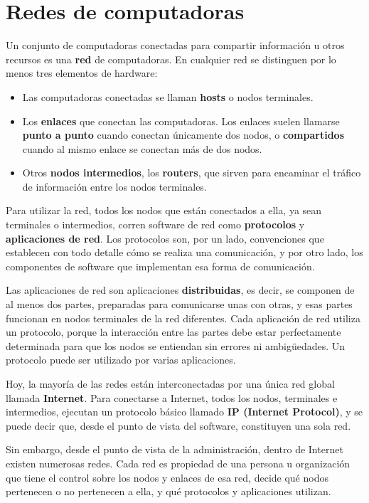 \documentclass[spanish,A4,]{article}
\begin{document}
\section{Redes de computadoras}\label{redes-de-computadoras}

Un conjunto de computadoras conectadas para compartir información u
otros recursos es una \textbf{red} de computadoras. En cualquier red se
distinguen por lo menos tres elementos de hardware:

\begin{itemize}
\itemsep1pt\parskip0pt
\item
  Las computadoras conectadas se llaman \textbf{hosts} o nodos
  terminales.
\item
  Los \textbf{enlaces} que conectan las computadoras. Los enlaces suelen
  llamarse \textbf{punto a punto} cuando conectan únicamente dos nodos,
  o \textbf{compartidos} cuando al mismo enlace se conectan más de dos
  nodos.
\item
  Otros \textbf{nodos intermedios}, los \textbf{routers}, que sirven
  para encaminar el tráfico de información entre los nodos terminales.
\end{itemize}

Para utilizar la red, todos los nodos que están conectados a ella, ya
sean terminales o intermedios, corren software de red como
\textbf{protocolos} y \textbf{aplicaciones de red}. Los protocolos son,
por un lado, convenciones que establecen con todo detalle cómo se
realiza una comunicación, y por otro lado, los componentes de software
que implementan esa forma de comunicación.

Las aplicaciones de red son aplicaciones \textbf{distribuidas}, es
decir, se componen de al menos dos partes, preparadas para comunicarse
unas con otras, y esas partes funcionan en nodos terminales de la red
diferentes. Cada aplicación de red utiliza un protocolo, porque la
interacción entre las partes debe estar perfectamente determinada para
que los nodos se entiendan sin errores ni ambigüedades. Un protocolo
puede ser utilizado por varias aplicaciones.

Hoy, la mayoría de las redes están interconectadas por una única red
global llamada \textbf{Internet}. Para conectarse a Internet, todos los
nodos, terminales e intermedios, ejecutan un protocolo básico llamado
\textbf{IP (Internet Protocol)}, y se puede decir que, desde el punto de
vista del software, constituyen una sola red.

Sin embargo, desde el punto de vista de la administración, dentro de
Internet existen numerosas redes. Cada red es propiedad de una persona u
organización que tiene el control sobre los nodos y enlaces de esa red,
decide qué nodos pertenecen o no pertenecen a ella, y qué protocolos y
aplicaciones utilizan.
\end{document}

